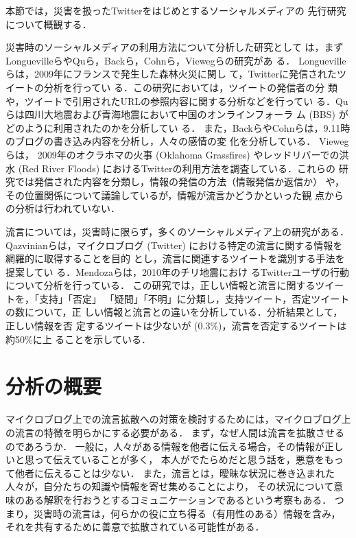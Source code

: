 \documentclass[japanese]{jnlp_1.4}
\begin{document}
本節では，災害を扱ったTwitterをはじめとするソーシャルメディアの
先行研究について概観する．

  災害時のソーシャルメディアの利用方法について分析した研究として
  は，まずLonguevilleらやQuら，Backら，Cohnら，Viewegらの研究があ
  る\cite{Inproc_Longueville,Inproc_Qu2009,Inproc_Qu,Article_Back,Article_Cohn,Inproc_Vieweg}．
  Longuevilleらは，2009年にフランスで発生した森林火災に関し
  て，Twitterに発信されたツイートの分析を行ってい
  る\cite{Inproc_Longueville}．この研究においては，ツイートの発信者の分
  類や，ツイートで引用されたURLの参照内容に関する分析などを行ってい
  る．Quらは四川大地震および青海地震において中国のオンラインフォーラ
  ム (BBS) がどのように利用されたのかを分析してい
  る\cite{Inproc_Qu2009,Inproc_Qu}．
  また，BackらやCohnらは，9.11時のブログの書き込み内容を分析し，人々の感情の変
  化を分析している\cite{Article_Back,Article_Cohn}．
Viewegら\cite{Inproc_Vieweg}は，
  2009年のオクラホマの火事 (Oklahoma Grassfires) やレッドリバーでの洪水
   (Red River Floods) におけるTwitterの利用方法を調査している．これらの
  研究では発信された内容を分類し，情報の発信の方法（情報発信か返信か）
  や，その位置関係について議論しているが，情報が流言かどうかといった観
  点からの分析は行われていない．


  流言については，災害時に限らず，多くのソーシャルメディア上の研究がある．
Qazvinianらは，マイクロブログ
   (Twitter) における特定の流言に関する情報を網羅的に取得することを目的
  とし，流言に関連するツイートを識別する手法を提案してい
  る\cite{Inproc_Qazvinian}．Mendozaらは，2010年のチリ地震におけ
  るTwitterユーザの行動について分析を行っている\cite{Inproc_Mendoza}．
  この研究では，正しい情報と流言に関するツイートを，「支持」「否定」
  「疑問」「不明」に分類し，支持ツイート，否定ツイートの数について，正
  しい情報と流言との違いを分析している．分析結果として，正しい情報を否
  定するツイートは少ないが (0.3\%)，流言を否定するツイートは約50\%に上
  ることを示している．



\section{分析の概要}

マイクロブログ上での流言拡散への対策を検討するためには，マイクロブログ上の流言の特徴を明らかにする必要がある．
まず，なぜ人間は流言を拡散させるのであろうか．
一般に，人々がある情報を他者に伝える場合，その情報が正しいと思って伝えていることが多く，
本人がでたらめだと思う話を，悪意をもって他者に伝えることは少ない\cite{Book_Kawakami}．
また，流言とは，曖昧な状況に巻き込まれた人々が，自分たちの知識や情報を寄せ集めることにより，
その状況について意味のある解釈を行おうとするコミュニケーションであるという考察もある\cite{Article_Sato}．
つまり，災害時の流言は，何らかの役に立ち得る（有用性のある）情報を含み，
それを共有するために善意で拡散されている可能性がある．
\end{document}
